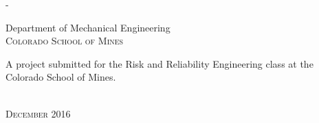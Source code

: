 \begin{titlingpage}
\begin{SingleSpace}
\begin{adjustwidth*}{\unitlength}{-\unitlength}
\begin{center}
\vspace{6mm}
{\large Department of Mechanical Engineering\\
\textsc{Colorado School of Mines}}\\
\vspace{11mm}
\begin{minipage}{10cm}
A project submitted for the Risk and Reliability Engineering class at the Colorado School of Mines.
\end{minipage}\\
\vspace{9mm}
{\large\textsc{December 2016}}
\vspace{12mm}
\end{center}
\end{adjustwidth*}
\end{SingleSpace}
\end{titlingpage}

